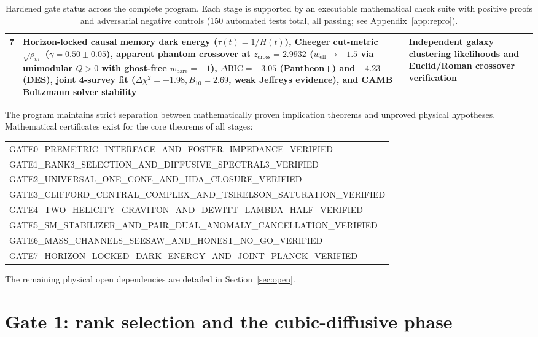 \documentclass[11pt]{article}
\theoremstyle{definition}
\theoremstyle{remark}
\begin{document}
\begin{table}[ht]
\begin{tabularx}{\textwidth}{@{}c Y Y@{}}
7 & Horizon-locked causal memory dark energy ($\tau(t)=1/H(t)$), Cheeger cut-metric $\sqrt{\rho_m}$ ($\gamma=0.50\pm 0.05$), apparent phantom crossover at $z_{\mathrm{cross}}=2.9932$ ($w_{\mathrm{eff}}\to -1.5$ via unimodular $Q>0$ with ghost-free $w_{\mathrm{bare}}=-1$), $\Delta\mathrm{BIC} = -3.05$ (Pantheon+) and $-4.23$ (DES), joint 4-survey fit ($\Delta\chi^2=-1.98, B_{10}=2.69$, weak Jeffreys evidence), and CAMB Boltzmann solver stability & Independent galaxy clustering likelihoods and Euclid/Roman crossover verification \\
\bottomrule
\end{tabularx}
\caption{Hardened gate status across the complete program. Each stage is supported by an executable mathematical check suite with positive proofs and adversarial negative controls (150 automated tests total, all passing; see Appendix~\ref{app:repro}).}
\label{tab:status}
\end{table}

The program maintains strict separation between mathematically proven implication theorems and unproved physical hypotheses. Mathematical certificates exist for the core theorems of all stages:
\begin{center}\small\ttfamily
\begin{tabular}{@{}l@{}}
GATE0\_PREMETRIC\_INTERFACE\_AND\_FOSTER\_IMPEDANCE\_VERIFIED\\
GATE1\_RANK3\_SELECTION\_AND\_DIFFUSIVE\_SPECTRAL3\_VERIFIED\\
GATE2\_UNIVERSAL\_ONE\_CONE\_AND\_HDA\_CLOSURE\_VERIFIED\\
GATE3\_CLIFFORD\_CENTRAL\_COMPLEX\_AND\_TSIRELSON\_SATURATION\_VERIFIED\\
GATE4\_TWO\_HELICITY\_GRAVITON\_AND\_DEWITT\_LAMBDA\_HALF\_VERIFIED\\
GATE5\_SM\_STABILIZER\_AND\_PAIR\_DUAL\_ANOMALY\_CANCELLATION\_VERIFIED\\
GATE6\_MASS\_CHANNELS\_SEESAW\_AND\_HONEST\_NO\_GO\_VERIFIED\\
GATE7\_HORIZON\_LOCKED\_DARK\_ENERGY\_AND\_JOINT\_PLANCK\_VERIFIED
\end{tabular}
\end{center}
The remaining physical open dependencies are detailed in Section~\ref{sec:open}.

\section{Gate 1: rank selection and the cubic-diffusive phase}
\label{sec:gate1}
\end{document}
